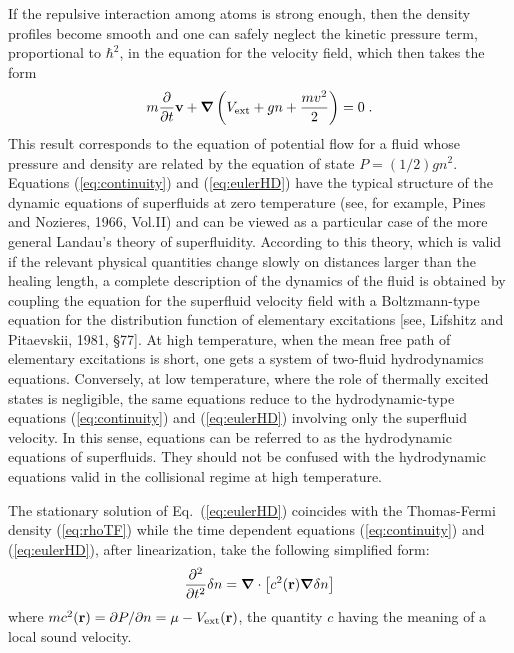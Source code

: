 If the repulsive interaction among atoms is strong enough, then the
density profiles become smooth and one can safely neglect the kinetic pressure 
term, proportional to $\hbar^2$,  in the equation for the velocity field, 
which then takes the form
\begin{equation}
m  { \partial \over \partial t} {\bf v} +
\mbox{\boldmath$\nabla$} \left( V_{\rm ext} + g n
+ { mv^2 \over 2 } \right) = 0 \; .
\label{eq:eulerHD}
\end{equation}
This result corresponds to  the equation of potential flow for a 
fluid whose pressure and density are related by the equation of state 
$P=(1/2)g n^2$. Equations (\ref{eq:continuity}) and (\ref{eq:eulerHD}) 
have the typical structure of the dynamic equations of superfluids at 
zero temperature (see, for example, Pines and Nozieres, 1966, Vol.II) 
and can be viewed as a particular case of the more general Landau's 
theory of superfluidity.  According to this theory, which is valid if 
the relevant physical quantities change slowly on distances larger than 
the healing length, a complete description of the dynamics of the
fluid is obtained by coupling the equation for the superfluid velocity 
field with a Boltzmann-type equation for the distribution function of 
elementary excitations [see, Lifshitz and Pitaevskii, 1981, \S 77].  
At high temperature, when the mean free path of elementary excitations 
is short, one gets a system of two-fluid hydrodynamics equations. 
Conversely, at low temperature, where the role of thermally excited
states is negligible, the same equations reduce to the hydrodynamic-type
equations (\ref{eq:continuity}) and (\ref{eq:eulerHD}) involving only
the superfluid velocity. In this sense, equations  can be referred 
to as the hydrodynamic equations of superfluids. They should not be 
confused with the hydrodynamic equations valid in the collisional 
regime at high temperature.

The stationary solution of Eq.~(\ref{eq:eulerHD}) coincides with the
Thomas-Fermi density (\ref{eq:rhoTF}) while the  time 
dependent equations (\ref{eq:continuity}) and (\ref{eq:eulerHD}),
after linearization, take the following simplified form:
\begin{equation}
{ \partial^2 \over \partial t^2 } \delta n = \mbox{\boldmath$\nabla$}
\cdot \left[ c^2({\bf r}) \mbox{\boldmath$\nabla$} \delta n
\right]
\label{eq:localsound}
\end{equation}
where $m c^2({\bf r}) =\partial P/\partial n =  \mu- V_{\rm ext}({\bf r})$, 
the quantity $c$ having the meaning of a local sound velocity.

